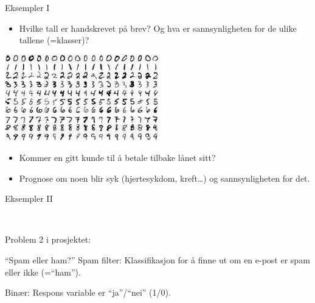 \documentclass[10pt,ignorenonframetext,]{beamer}
\providecommand{\tightlist}{%
  \setlength{\itemsep}{0pt}\setlength{\parskip}{0pt}}
\begin{document}
\begin{frame}

\begin{block}{Eksempler I}

\vspace{2mm}

\begin{itemize}
\tightlist
\item
  Hvilke tall er handskrevet på brev? Og hva er sannsynligheten for de
  ulike tallene (=klasser)? \vspace{2mm}
\end{itemize}

\centering

\includegraphics[width=0.5\textwidth,height=\textheight]{mnist.jpeg}

\vspace{4mm}

\flushleft

\begin{itemize}
\tightlist
\item
  Kommer en gitt kunde til å betale tilbake lånet sitt?
\end{itemize}

\vspace{2mm}

\begin{itemize}
\tightlist
\item
  Prognose om noen blir syk (hjertesykdom, kreft\ldots{}) og
  sannsynligheten for det.
\end{itemize}

\end{block}

\end{frame}

\begin{frame}

\begin{block}{Eksempler II}

\(~\)

Problem 2 i prosjektet:

\vspace{2mm}

``Spam eller ham?'' Spam filter: Klassifikasjon for å finne ut om en
e-post er spam eller ikke (=``ham'').

\vspace{2mm}

Binær: Respons variable er ``ja''/``nei'' (1/0).

\vspace{2mm}

\end{block}

\end{frame}
\end{document}
